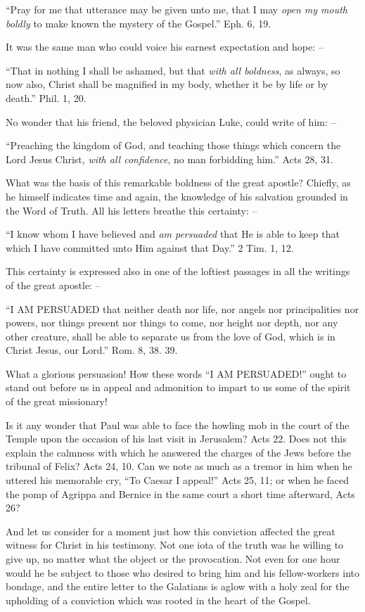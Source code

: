 \documentclass[
]{book}
\begin{document}
``Pray for me that utterance may be given unto me, that I may \emph{open my mouth boldly} to make known the mystery of the Gospel.'' Eph. 6, 19.

It was the same man who could voice his earnest expectation and hope: --

``That in nothing I shall be ashamed, but that \emph{with all boldness}, as always, so now also, Christ shall be magnified in my body, whether it be by life or by death.'' Phil. 1, 20.

No wonder that his friend, the beloved physician Luke, could write of him: --

``Preaching the kingdom of God, and teaching those things which concern the Lord Jesus Christ, \emph{with all confidence}, no man forbidding him.'' Acts 28, 31.

What was the basis of this remarkable boldness of the great apostle? Chiefly, as he himself indicates time and again, the knowledge of his salvation grounded in the Word of Truth. All his letters breathe this certainty: --

``I know whom I have believed and \emph{am persuaded} that He is able to keep that which I have committed unto Him against that Day.'' 2 Tim. 1, 12.

This certainty is expressed also in one of the loftiest passages in all the writings of the great apostle: --

``I AM PERSUADED that neither death nor life, nor angels nor principalities nor powers, nor things present nor things to come, nor height nor depth, nor any other creature, shall be able to separate us from the love of God, which is in Christ Jesus, our Lord.'' Rom. 8, 38. 39.

What a glorious persuasion! How these words ``I AM PERSUADED!'' ought to stand out before us in appeal and admonition to impart to us some of the spirit of the great missionary!

Is it any wonder that Paul was able to face the howling mob in the court of the Temple upon the occasion of his last visit in Jerusalem? Acts 22. Does not this explain the calmness with which he answered the charges of the Jews before the tribunal of Felix? Acts 24, 10. Can we note as much as a tremor in him when he uttered his memorable cry, ``To Caesar I appeal!'' Acts 25, 11; or when he faced the pomp of Agrippa and Bernice in the same court a short time afterward, Acts 26?

And let us consider for a moment just how this conviction affected the great witness for Christ in his testimony. Not one iota of the truth was he willing to give up, no matter what the object or the provocation. Not even for one hour would he be subject to those who desired to bring him and his fellow-workers into bondage, and the entire letter to the Galatians is aglow with a holy zeal for the upholding of a conviction which was rooted in the heart of the Gospel.
\end{document}
